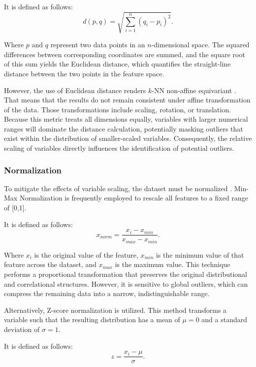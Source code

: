 It is defined as follows:
\begin{equation}
    d(p, q) = \sqrt{\sum_{i=1}^{n} (q_i - p_i)^2}.
\end{equation}


Where $p$ and $q$ represent two data points in an $n$-dimensional space.
The squared differences between corresponding coordinates are summed, and the square root of this sum yields the Euclidean distance, which quantifies the straight-line distance between the two points in the feature space.


However, the use of Euclidean distance renders $k$-NN non-affine equivariant \citep[p. 24]{biau2012affine}. 
That means that the results do not remain consistent under affine transformation of the data.
Those transformations include scaling, rotation, or translation. 
Because this metric treats all dimensions equally, variables with larger numerical ranges will dominate the distance calculation, potentially masking outliers that exist within the distribution of smaller-scaled variables. 
Consequently, the relative scaling of variables directly influences the identification of potential outliers.

\newpage
\subsubsection*{Normalization}
To mitigate the effects of variable scaling, the dataset must be normalized \citep[p. 3]{performance2021effect}. 
Min-Max Normalization is frequently employed to rescale all features to a fixed range of [0,1]. 


It is defined as follows:
\begin{equation}
    x_{norm} = \frac{x_i - x_{min}}{x_{max} - x_{min}}.
\end{equation}


Where $x_i$ is the original value of the feature, $x_{min}$ is the minimum value of that feature across the dataset, and $x_{max}$ is the maximum value.
This technique performs a proportional transformation that preserves the original distributional and correlational structures. 
However, it is sensitive to global outliers, which can compress the remaining data into a narrow, indistinguishable range.


Alternatively, Z-score normalization is utilized. 
This method transforms a variable such that the resulting distribution has a mean of $\mu=0$ and a standard deviation of $\sigma=1$. 

It is defined as follows:
\begin{equation}
    z = \frac{x_i - \mu}{\sigma}.
\end{equation}



